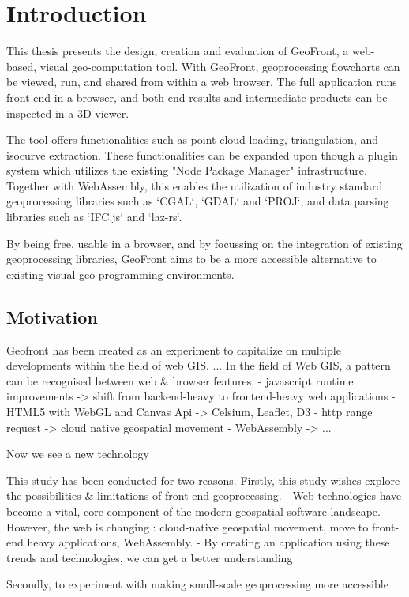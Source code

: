 \chapter{Introduction}
This thesis presents the design, creation and evaluation of GeoFront, a web-based, visual geo-computation tool. 
With GeoFront, geoprocessing flowcharts can be viewed, run, and shared from within a web browser.  
The full application runs front-end in a browser, and both end results and intermediate products can be inspected in a 3D viewer.

The tool offers functionalities such as point cloud loading, triangulation, and isocurve extraction.
These functionalities can be expanded upon though a plugin system which utilizes the existing "Node Package Manager" infrastructure.
Together with WebAssembly, this enables the utilization of industry standard geoprocessing libraries such as `CGAL`, `GDAL` and `PROJ`, and data parsing libraries such as `IFC.js` and `laz-rs`.

By being free, usable in a browser, and by focussing on the integration of existing geoprocessing libraries, GeoFront aims to be a more accessible alternative to existing visual geo-programming environments.

\section{Motivation}
Geofront has been created as an experiment to capitalize on multiple developments within the field of web GIS. 
...
In the field of Web GIS, a pattern can be recognised between web & browser features,  
- javascript runtime improvements -> shift from backend-heavy to frontend-heavy web applications
- HTML5 with WebGL and Canvas Api -> Celsium, Leaflet, D3
- http range request -> cloud native geospatial movement 
- WebAssembly -> ...

Now we see a new technology 

This study has been conducted for two reasons.
Firstly, this study wishes explore the possibilities \& limitations of front-end geoprocessing.
  - Web technologies have become a vital, core component of the modern geospatial software landscape.
  - However, the web is changing : cloud-native geospatial movement, move to front-end heavy applications, WebAssembly. 
  - By creating an application using these trends and technologies, we can get a better understanding 

Secondly, to experiment with making small-scale geoprocessing more accessible


